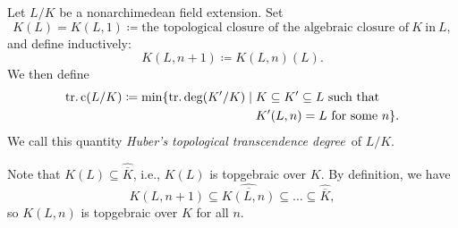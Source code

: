 \begin{defn} Let $L/K$ be a nonarchimedean field extension. Set \begin{equation*}K(L)=K(L,1)\coloneqq{} \textrm{the topological closure of the algebraic closure of}~K~\textrm{in}~L,\end{equation*}and define inductively: 
\begin{equation*}
K(L,n+1)\coloneqq K(L,n)(L).
\end{equation*}We then define 
\begin{align*}
\operatorname{tr.c}(L/K)\coloneqq \min\{\operatorname{tr.deg}(K^{\prime}/K)\mid{} & K\subseteq K^{\prime}\subseteq L
\text{ such that}\\
& K^{\prime}(L,n)=L \text{ for some } n\}.
\end{align*}
We call this quantity \emph{Huber's topological transcendence degree} of $L/K$. 
\end{defn}
Note that $K(L)\subseteq \widehat{\overline{K}}$, i.e., $K(L)$ is topgebraic over $K$. By definition, we have\begin{equation*}
K(L,n+1)\subseteq \widehat{\overline{K(L,n)}}\subseteq \dots \subseteq
\widehat{\overline{K}},
\end{equation*}
so $K(L,n)$ is topgebraic over $K$ for all $n$.

